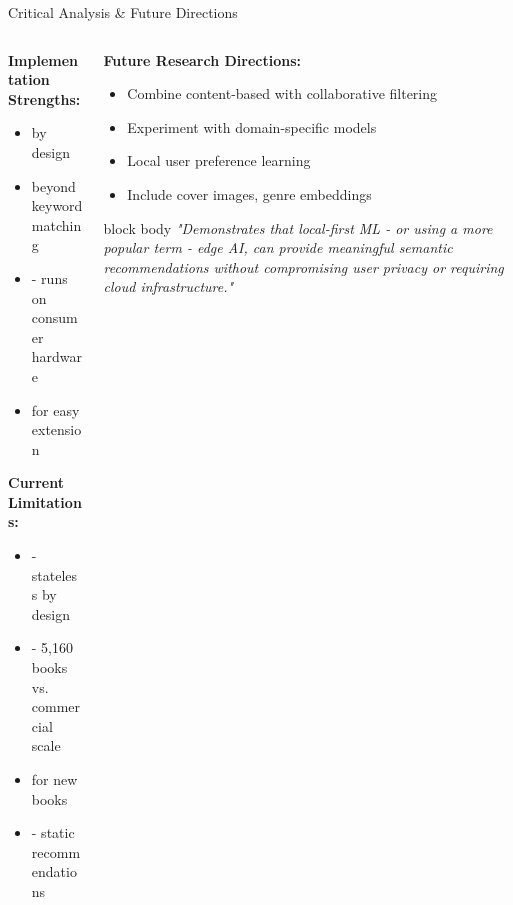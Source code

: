 \begin{frame}{Critical Analysis \& Future Directions}

\begin{columns}[T]
  \begin{column}{0.50\textwidth}
    \textbf{Implementation Strengths:}
    \begin{itemize}
      \item {} by design
      \item {} beyond keyword matching
      \item {} - runs on consumer hardware
      \item {} for easy extension
    \end{itemize}

    \vspace{0.3cm}
    \textbf{Current Limitations:}
    \begin{itemize}
      \item {} - stateless by design
      \item {} - 5,160 books vs. commercial scale
      \item {} for new books
      \item {} - static recommendations
    \end{itemize}
  \end{column}

  \begin{column}{0.45\textwidth}
    \textbf{Future Research Directions:}
    \begin{itemize}
      \item {} Combine content-based with collaborative filtering
      \item {} Experiment with domain-specific models
      \item {} Local user preference learning
      \item {} Include cover images, genre embeddings
    \end{itemize}

    \begin{center}
    \begin{beamercolorbox}[sep=8pt,center,rounded=true]{block body}
    \scriptsize \textit{"Demonstrates that local-first ML - or using a more popular term - edge AI, can provide meaningful semantic recommendations without compromising user privacy or requiring cloud infrastructure."}
    \end{beamercolorbox}
    \end{center}
  \end{column}
\end{columns}

\end{frame}